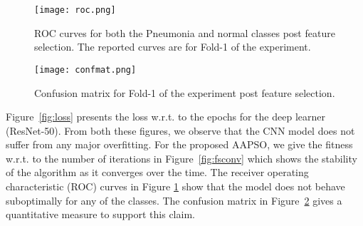 \documentclass[final,3p,times]{elsarticle}
\begin{document}
\begin{figure}[ht!]
    \centering
    \texttt{[image: roc.png]}
    \caption{ROC curves for both the Pneumonia and normal classes post feature selection. The reported curves are for Fold-1 of the experiment.}
    \label{fig:roc}
\end{figure}
\begin{figure}
    \centering
    \texttt{[image: confmat.png]}
    \caption{Confusion matrix for Fold-1 of the experiment post feature selection.}
    \label{fig:confmat}
\end{figure}
Figure~\ref{fig:loss} presents the loss w.r.t. to the epochs for the deep learner (ResNet-50). From both these figures, we observe that the CNN model does not suffer from any major overfitting. For the proposed AAPSO, we give the fitness w.r.t. to the number of iterations in Figure~\ref{fig:fsconv} which shows the stability of the algorithm as it converges over the time.
The {receiver operating characteristic} (ROC) curves in Figure \ref{fig:roc} show that the model does not behave suboptimally for any of the classes. The confusion matrix in Figure~\ref{fig:confmat} gives a quantitative measure to support this claim. 
\end{document}
